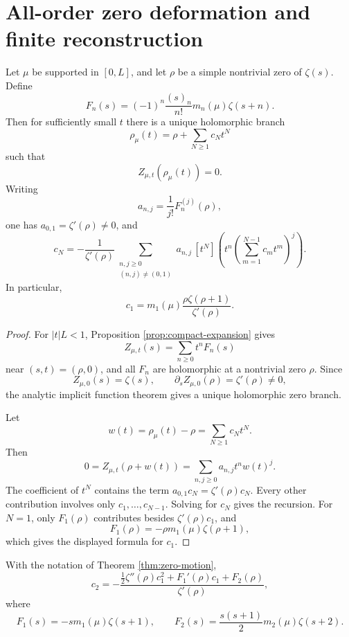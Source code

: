 \section{All-order zero deformation and finite reconstruction}

\begin{theorem}\label{thm:zero-motion}
Let \(\mu\) be supported in \([0,L]\), and let \(\rho\) be a simple nontrivial zero of \(\zeta(s)\).  Define
\[
   F_n(s)=(-1)^n\frac{(s)_n}{n!}m_n(\mu)\zeta(s+n).
\]
Then for sufficiently small \(t\) there is a unique holomorphic branch
\[
   \rho_\mu(t)=\rho+\sum_{N\ge1}c_Nt^N
\]
such that
\[
   Z_{\mu,t}(\rho_\mu(t))=0.
\]
Writing
\[
   a_{n,j}=\frac1{j!}F_n^{(j)}(\rho),
\]
one has \(a_{0,1}=\zeta'(\rho)\ne0\), and
\[
 c_N=-\frac1{\zeta'(\rho)}
 \sum_{\substack{n,j\ge0\\(n,j)\ne(0,1)}}
 a_{n,j}\,[t^N]\left(t^n\left(\sum_{m=1}^{N-1}c_mt^m\right)^j\right).
\]
In particular,
\[
   c_1=m_1(\mu)\frac{\rho\zeta(\rho+1)}{\zeta'(\rho)}.
\]
\end{theorem}

\begin{proof}
For \(|t|L<1\), Proposition \ref{prop:compact-expansion} gives
\[
   Z_{\mu,t}(s)=\sum_{n\ge0}t^nF_n(s)
\]
near \((s,t)=(\rho,0)\), and all \(F_n\) are holomorphic at a nontrivial zero \(\rho\).  Since
\[
   Z_{\mu,0}(s)=\zeta(s),
   \qquad
   \partial_s Z_{\mu,0}(\rho)=\zeta'(\rho)\ne0,
\]
the analytic implicit function theorem gives a unique holomorphic zero branch.

Let
\[
   w(t)=\rho_\mu(t)-\rho=\sum_{N\ge1}c_Nt^N.
\]
Then
\[
   0=Z_{\mu,t}(\rho+w(t))=\sum_{n,j\ge0}a_{n,j}t^n w(t)^j.
\]
The coefficient of \(t^N\) contains the term \(a_{0,1}c_N=\zeta'(\rho)c_N\).  Every other contribution involves only \(c_1,\ldots,c_{N-1}\).  Solving for \(c_N\) gives the recursion.  For \(N=1\), only \(F_1(\rho)\) contributes besides \(\zeta'(\rho)c_1\), and
\[
   F_1(\rho)=-\rho m_1(\mu)\zeta(\rho+1),
\]
which gives the displayed formula for \(c_1\).
\end{proof}

\begin{proposition}\label{prop:second-coeff}
With the notation of Theorem \ref{thm:zero-motion},
\[
   c_2=-\frac{\frac12\zeta''(\rho)c_1^2+F_1'(\rho)c_1+F_2(\rho)}{\zeta'(\rho)},
\]
where
\[
   F_1(s)=-s m_1(\mu)\zeta(s+1),
   \qquad
   F_2(s)=\frac{s(s+1)}2m_2(\mu)\zeta(s+2).
\]
\end{proposition}

